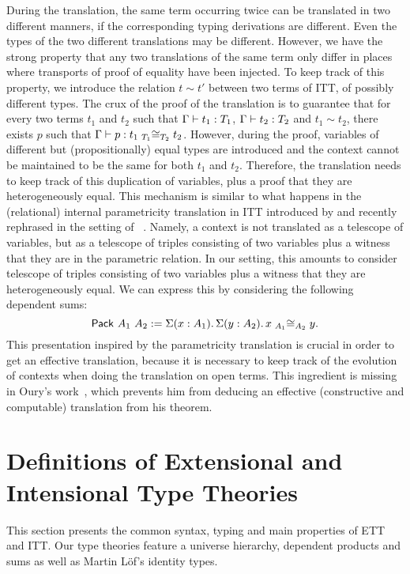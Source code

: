 During the translation, the same term occurring twice can be
translated in two different manners, if the corresponding typing
derivations are different. Even the types of the two different
translations may be different.
%
However, we have the strong property that any two translations of the
same term only differ in places where transports of proof of equality have been
injected.
%
To keep track of this property, we introduce the relation $t \sim t'$
between two terms of ITT, of possibly different types.
%
The crux of the proof of the translation is to guarantee that for
every two terms $t_1$ and $t_2$ such that $\isterm{\Ga}{t_1}{T_1}$,
  $\isterm{\Ga}{t_2}{T_2}$ and $t_1 \sim t_2$, there exists $p$ such
  that
  $\isterm{\Ga} {p} {\Heq{{T_1}} {{t_1}} {{T_2}} {{t_2}}}$.
%
However, during the proof, variables of different but (propositionally) equal
types are introduced and the context cannot be maintained to be the same
for both $t_1$ and $t_2$. Therefore, the translation needs to keep
track of this duplication of variables, plus a proof that they are
heterogeneously equal.
%
This mechanism is similar to what happens in the (relational) internal
parametricity translation in ITT introduced by
 and recently rephrased in the setting of
\TemplateCoq~. Namely, a context is not
translated as a telescope of variables, but as a telescope of triples
consisting of two variables plus a witness that they are in the
parametric relation.
%
In our setting, this amounts to consider telescope of triples
consisting of two variables plus a witness that they are
heterogeneously equal. We can express this by considering the
following dependent sums:
\[
\Pack{A_1}{A_2} := \Sum{x:A_1} \Sum{y:A_2} \Heq{A_1}{x}{A_2}{y}.
\]
%
This presentation inspired by the parametricity translation is crucial
in order to get an effective translation, because it is necessary to
keep track of the evolution of contexts when doing the translation on
open terms.
%
This ingredient is missing in Oury's work~,
which prevents him from deducing an effective (\ie constructive and
computable) translation from his theorem.

\section{Definitions of Extensional and Intensional Type Theories}
\label{sec:syntax-features}

This section presents the common syntax, typing and main properties of
ETT and ITT. Our type theories feature a universe hierarchy, dependent
products and sums as well as Martin Löf's identity types.


